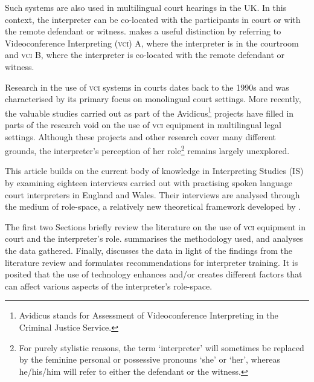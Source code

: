 \documentclass[output=paper]{langsci/langscibook}
\begin{document}
Such systems are also used in multilingual court hearings in the UK. In this context, the interpreter can be co-located with the participants in court or with the remote defendant or witness. \citet{Braun2011a} makes a useful distinction by referring to Videoconference Interpreting (\textsc{vci}) A, where the interpreter is in the courtroom and \textsc{vci} B, where the interpreter is co-located with the remote defendant or witness. 

Research in the use of \textsc{vci} systems in courts dates back to the 1990s and was characterised by its primary focus on monolingual court settings. More recently, the valuable studies carried out as part of the Avidicus\footnote{Avidicus stands for Assessment of Videoconference Interpreting in the Criminal Justice Service.}  projects have filled in parts of the research void on the use of \textsc{vci} equipment in multilingual legal settings. Although these projects and other research cover many different grounds, the interpreter’s perception of her role\footnote{For purely stylistic reasons, the term ‘interpreter’ will sometimes be replaced by the feminine personal or possessive pronouns ‘she’ or ‘her’, whereas he/his/him will refer to either the defendant or the witness.} remains largely unexplored. 

This article builds on the current body of knowledge in Interpreting Studies (IS) by examining eighteen interviews carried out with practising spoken language court interpreters in England and Wales. Their interviews are analysed through the medium of role-space, a relatively new theoretical framework developed by \citet{Llewellyn-Jones2014}.

The first two Sections briefly review the literature on the use of \textsc{vci} equipment in court and the interpreter’s role.  summarises the methodology used, and  analyses the data gathered. Finally,  discusses the data in light of the findings from the literature review and formulates recommendations for interpreter training. It is posited that the use of technology enhances and/or creates different factors that can affect various aspects of the interpreter’s role-space.  
\end{document}

